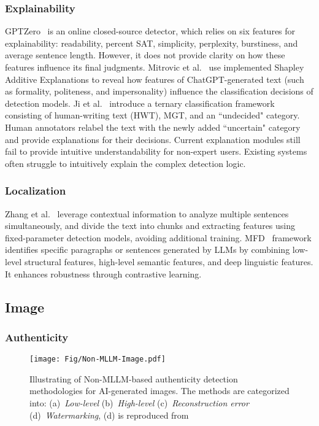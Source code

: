 \subsubsection{\textbf{Explainability}}
GPTZero~\cite{gptzero} is an online closed-source detector, which relies on six features for explainability: readability, percent SAT,
simplicity, perplexity, burstiness, and average sentence length. However, it does not provide clarity
on how these features influence its final judgments. Mitrovic et al.~\cite{mitrovic2023chatgpt} use implemented Shapley Additive Explanations to reveal how features of ChatGPT-generated text (such as formality, politeness, and impersonality) influence the classification decisions of detection models.
Ji et al.~\cite{ji2024detecting} introduce a ternary classification framework consisting of human-writing text (HWT), MGT, and an ``undecided" category. Human annotators relabel the text with the newly added ``uncertain" category and provide explanations for their decisions. Current explanation modules still fail to provide intuitive understandability for non-expert users. Existing systems often struggle to intuitively explain the complex detection logic.

\subsubsection{\textbf{Localization}} Zhang et al.~\cite{zhang2024machine} leverage contextual information to analyze multiple sentences simultaneously, and divide the text into chunks and extracting features using fixed-parameter detection models, avoiding additional training. MFD~\cite{tao2024unveiling} framework identifies specific paragraphs or sentences generated by LLMs by combining low-level structural features, high-level semantic features, and deep linguistic features. It enhances robustness through contrastive learning.

\subsection{Image}
\subsubsection{\textbf{Authenticity}}

\begin{figure}[!ht]
  \centering
    \texttt{[image: Fig/Non-MLLM-Image.pdf]}
    \caption{Illustrating of Non-MLLM-based authenticity detection methodologies for AI-generated images. The methods are categorized into: (a)~\textit{Low-level} (b)~\textit{High-level} (c)~\textit{Reconstruction error} (d)~\textit{Watermarking}, (d) is reproduced from~\cite{luo2025digital}}
    \label{fig:Non-MLLM-Image}
\end{figure}

